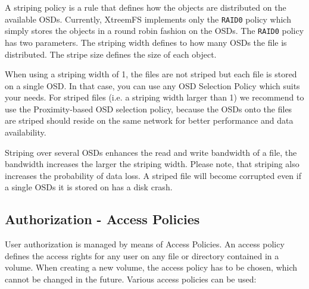 \documentclass[a4paper,10pt]{book}
\begin{document}
A striping policy is a rule that defines how the objects are distributed on the available OSDs. Currently, XtreemFS implements only the \texttt{RAID0} policy which simply stores the objects in a round robin fashion on the OSDs. The \texttt{RAID0} policy has two parameters. The striping width defines to how many OSDs the file is distributed. The stripe size defines the size of each object.

When using a striping width of 1, the files are not striped but each file is stored on a single OSD. In that case, you can use any OSD Selection Policy which suits your needs. For striped files (i.e. a striping width larger than 1) we recommend to use the Proximity-based OSD selection policy, because the OSDs onto the files are striped should reside on the same network for better performance and data availability.

Striping over several OSDs enhances the read and write bandwidth of a file, the bandwidth increases the larger the striping width. Please note, that striping also increases the probability of data loss. A striped file will become corrupted even if a single OSDs it is stored on has a disk crash.

\subsection{Authorization - Access Policies} \label{sec:access_policies}

User authorization is managed by means of Access Policies. An access policy defines the access rights for any user on any file or directory contained in a volume. When creating a new volume, the access policy has to be chosen, which cannot be changed in the future. Various access policies can be used: 
\end{document}
